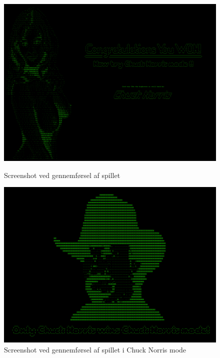 \begin{figure}[ht]
\begin{minipage}[b]{0.5\linewidth}
\centering
\includegraphics[width=\textwidth]{figs/screenshots/won_normal.png}
\caption{Screenshot ved gennemførsel af spillet}
\label{fig:won_normal_2}
\end{minipage}
\hspace{0.5cm}
\begin{minipage}[b]{0.5\linewidth}
\centering
\includegraphics[width=\textwidth]{figs/screenshots/won_chuck_crop.png}
\caption{Screenshot ved gennemførsel af spillet i Chuck Norris mode}
\label{fig:won_chuck}
\end{minipage}
\end{figure}













